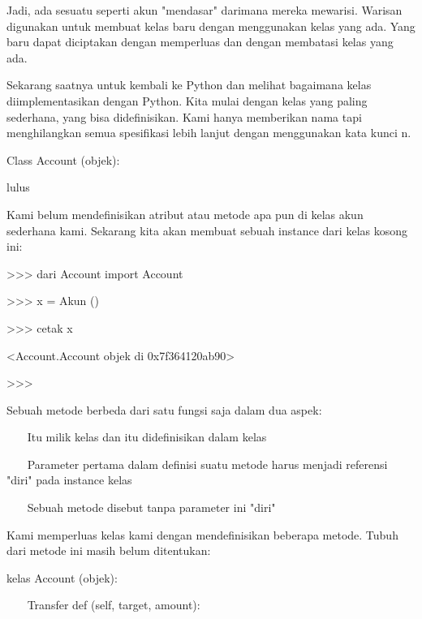 Jadi, ada sesuatu seperti akun "mendasar" darimana mereka mewarisi. Warisan digunakan untuk membuat kelas baru dengan menggunakan kelas yang ada. Yang baru dapat diciptakan dengan memperluas dan dengan membatasi kelas yang ada. \par
\vspace{12pt}
Sekarang saatnya untuk kembali ke Python dan melihat bagaimana kelas diimplementasikan dengan Python. Kita mulai dengan kelas yang paling sederhana, yang bisa didefinisikan. Kami hanya memberikan nama tapi menghilangkan semua spesifikasi lebih lanjut dengan menggunakan kata kunci n. \par
\vspace{12pt}
Class Account (objek): \par
lulus \par
\vspace{12pt}
Kami belum mendefinisikan atribut atau metode apa pun di kelas akun sederhana kami. Sekarang kita akan membuat sebuah instance dari kelas kosong ini: \par
\vspace{12pt}
\vspace{12pt}
\vspace{12pt}
\vspace{12pt}
>>> dari Account import Account \par
>>> x = Akun () \par
>>> cetak x \par
<Account.Account objek di 0x7f364120ab90> \par
>>> \par
\vspace{12pt}
Sebuah metode berbeda dari satu fungsi saja dalam dua aspek: \par
\vspace{12pt}
~~~ Itu milik kelas dan itu didefinisikan dalam kelas \par
~~~ Parameter pertama dalam definisi suatu metode harus menjadi referensi "diri" pada instance kelas \par
~~~ Sebuah metode disebut tanpa parameter ini "diri" \par
\vspace{12pt}
Kami memperluas kelas kami dengan mendefinisikan beberapa metode. Tubuh dari metode ini masih belum ditentukan: \par
\vspace{12pt}
kelas Account (objek): \par
\vspace{12pt}
~~~ Transfer def (self, target, amount): \par
